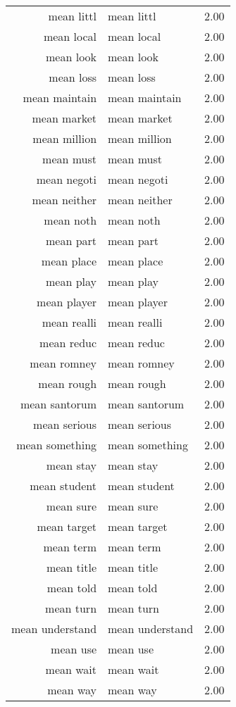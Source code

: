 \begin{table}[ht]
\begin{tabular}{rlr}
  mean littl & mean littl & 2.00 \\ 
  mean local & mean local & 2.00 \\ 
  mean look & mean look & 2.00 \\ 
  mean loss & mean loss & 2.00 \\ 
  mean maintain & mean maintain & 2.00 \\ 
  mean market & mean market & 2.00 \\ 
  mean million & mean million & 2.00 \\ 
  mean must & mean must & 2.00 \\ 
  mean negoti & mean negoti & 2.00 \\ 
  mean neither & mean neither & 2.00 \\ 
  mean noth & mean noth & 2.00 \\ 
  mean part & mean part & 2.00 \\ 
  mean place & mean place & 2.00 \\ 
  mean play & mean play & 2.00 \\ 
  mean player & mean player & 2.00 \\ 
  mean realli & mean realli & 2.00 \\ 
  mean reduc & mean reduc & 2.00 \\ 
  mean romney & mean romney & 2.00 \\ 
  mean rough & mean rough & 2.00 \\ 
  mean santorum & mean santorum & 2.00 \\ 
  mean serious & mean serious & 2.00 \\ 
  mean something & mean something & 2.00 \\ 
  mean stay & mean stay & 2.00 \\ 
  mean student & mean student & 2.00 \\ 
  mean sure & mean sure & 2.00 \\ 
  mean target & mean target & 2.00 \\ 
  mean term & mean term & 2.00 \\ 
  mean title & mean title & 2.00 \\ 
  mean told & mean told & 2.00 \\ 
  mean turn & mean turn & 2.00 \\ 
  mean understand & mean understand & 2.00 \\ 
  mean use & mean use & 2.00 \\ 
  mean wait & mean wait & 2.00 \\ 
  mean way & mean way & 2.00 \\ 

\end{tabular}
\end{table}
